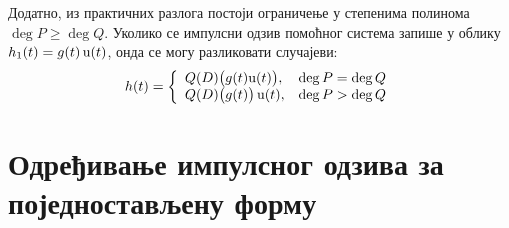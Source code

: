 \vspace*{2mm}
Додатно, из практичних 
разлога постоји ограничење у степенима
полинома $\deg P \geq \deg Q$.  
Уколико се импулсни одзив помоћног система запише 
у облику $h_1(t) = g(t)\,{\rm u}(t)$, онда се
могу разликовати случајеви:
\begin{equation}
h(t) = 
\left\{
\begin{array}{ll}
Q(D)\bigl( g(t){\rm u}(t) \bigr), & \deg P = \deg Q \\
Q(D)\bigl( g(t)\bigr)\, {\rm u}(t) , & \deg P > \deg Q \\
\end{array}
\right.
\end{equation}


\section{Одређивање импулсног одзива за
поједностављену форму}

